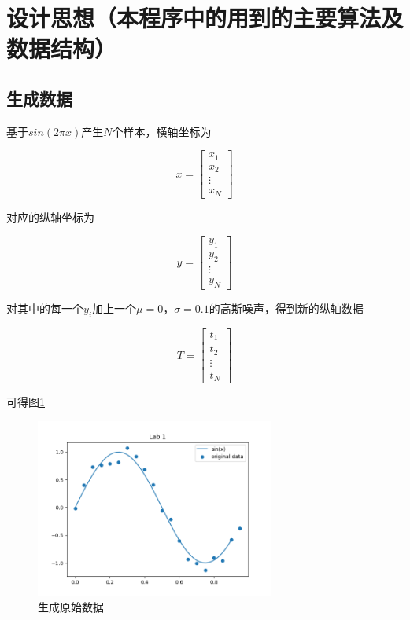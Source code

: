 \section{设计思想（本程序中的用到的主要算法及数据结构）}

\subsection{生成数据}

基于$sin(2\pi x)$产生$N$个样本，横轴坐标为

\begin{equation}
    x =
    \begin{bmatrix}
        x_1 \\ x_2 \\ \vdots \\ x_N
    \end{bmatrix}
\end{equation}

对应的纵轴坐标为

\begin{equation}
    y =
    \begin{bmatrix}
        y_1 \\ y_2 \\ \vdots \\ y_N
    \end{bmatrix}
\end{equation}

对其中的每一个$y_i$加上一个$\mu = 0$，$\sigma = 0.1$的高斯噪声，得到新的纵轴数据

\begin{equation}
    T =
    \begin{bmatrix}
        t_1 \\ t_2 \\ \vdots \\ t_N
    \end{bmatrix}
\end{equation}

可得图\ref{raw_data}

\begin{figure}[htbp]
    \centering
    \includegraphics[width=0.7\textwidth]{figures/Figure_1.png}
    \caption{生成原始数据}
    \label{raw_data}
\end{figure}


